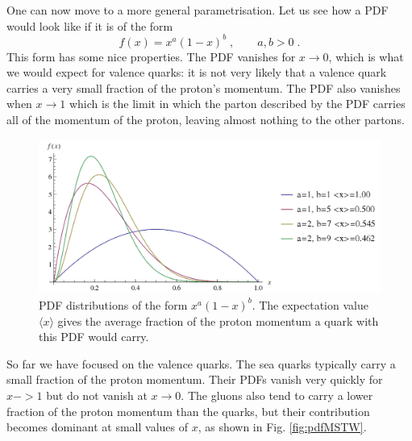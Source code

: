 \documentclass[12pt]{article}
\begin{document}
One can now move to a more general parametrisation. Let us see how a PDF would look like if it is of the form
\[f(x)=x^a(1-x)^b\;,\qquad a,b>0\;.\]
This form has some nice properties. The PDF vanishes for $x\rightarrow 0$, which is what we would expect for valence quarks: it is not very likely that a valence quark carries a very small fraction of the proton's momentum. The PDF also vanishes when $x\rightarrow 1$ which is the limit in which the parton described by the PDF carries all of the momentum of the proton, leaving almost nothing to the other partons.     
\begin{figure}[h]
  \begin{center}\includegraphics[scale=0.25]{images/PDFs.png}
    \end{center}
  \caption{PDF distributions of the form $x^a(1-x)^b$. The expectation value $\langle x\rangle$ gives the average fraction of the proton momentum a quark with this PDF would carry. }
  \label{fig:pdfab}
  \end{figure}
So far we have focused on the valence quarks. The sea quarks typically carry a small fraction of the proton momentum. Their PDFs vanish very quickly for $x->1$ but do not vanish at $x\rightarrow 0$. The gluons also tend to carry a lower fraction of the proton momentum than the quarks, but their contribution becomes dominant at small values of $x$, as shown in Fig. \ref{fig:pdfMSTW}.
\end{document}
